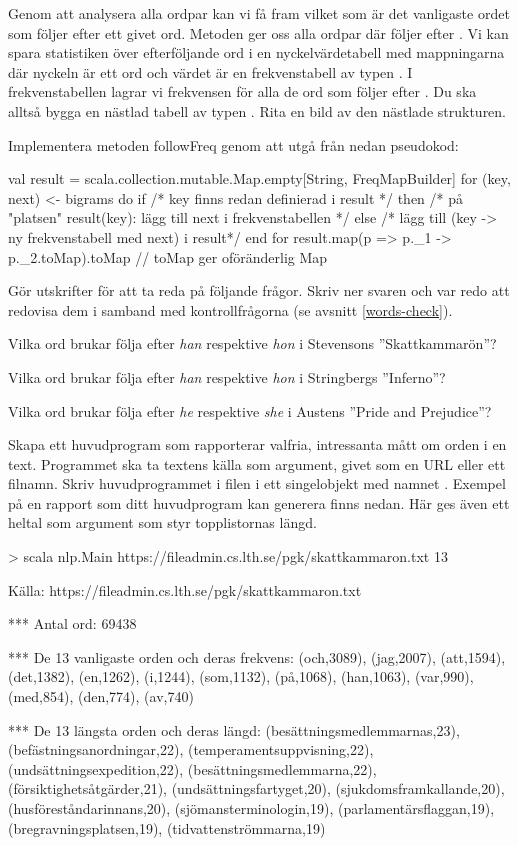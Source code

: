 Genom att analysera alla ordpar kan vi få fram vilket som är det vanligaste ordet som följer efter ett givet ord. Metoden  ger oss alla ordpar  där  följer efter . Vi kan spara statistiken över efterföljande ord i en nyckelvärdetabell med mappningarna  där nyckeln  är ett ord  och värdet  är en frekvenstabell av typen . I frekvenstabellen lagrar vi frekvensen för alla de ord som följer efter . Du ska alltså bygga en nästlad tabell av typen . Rita en bild av den nästlade strukturen.\Pen

Implementera metoden followFreq genom att utgå från nedan pseudokod:
\begin{Code}
val result = scala.collection.mutable.Map.empty[String, FreqMapBuilder]
for (key, next) <- bigrams do
  if /* key finns redan definierad i result */ then
    /* på "platsen" result(key): lägg till next i frekvenstabellen */
  else
    /* lägg till (key -> ny frekvenstabell med next) i result*/
end for
result.map(p => p._1 -> p._2.toMap).toMap // toMap ger oföränderlig Map
\end{Code}
Gör utskrifter för att ta reda på följande frågor. Skriv ner svaren och var redo att redovisa dem i samband med kontrollfrågorna (se avsnitt \ref{words-check}).\Pen

\Subtask Vilka ord brukar följa efter \emph{han} respektive \emph{hon} i Stevensons ''Skattkammarön''?

\Subtask Vilka ord brukar följa efter \emph{han} respektive \emph{hon} i Stringbergs ''Inferno''?

\Subtask Vilka ord brukar följa efter \emph{he} respektive \emph{she} i Austens ''Pride and Prejudice''?


\Task Skapa ett huvudprogram som rapporterar valfria, intressanta mått om orden i en text. Programmet ska ta textens källa som argument, givet som en URL eller ett filnamn. Skriv huvudprogrammet i filen  i ett singelobjekt med namnet . Exempel på en rapport som ditt huvudprogram kan generera finns nedan. Här ges även ett heltal som argument som styr topplistornas längd.
\begin{REPL}
> scala nlp.Main https://fileadmin.cs.lth.se/pgk/skattkammaron.txt 13

Källa: https://fileadmin.cs.lth.se/pgk/skattkammaron.txt

*** Antal ord: 69438

*** De 13 vanligaste orden och deras frekvens:
(och,3089), (jag,2007), (att,1594), (det,1382), (en,1262),
(i,1244), (som,1132), (på,1068), (han,1063), (var,990),
(med,854), (den,774), (av,740)

*** De 13 längsta orden och deras längd:
(besättningsmedlemmarnas,23), (befästningsanordningar,22),
(temperamentsuppvisning,22), (undsättningsexpedition,22),
(besättningsmedlemmarna,22), (försiktighetsåtgärder,21),
(undsättningsfartyget,20), (sjukdomsframkallande,20),
(husföreståndarinnans,20), (sjömansterminologin,19),
(parlamentärsflaggan,19), (bregravningsplatsen,19),
(tidvattenströmmarna,19)
\end{REPL}

